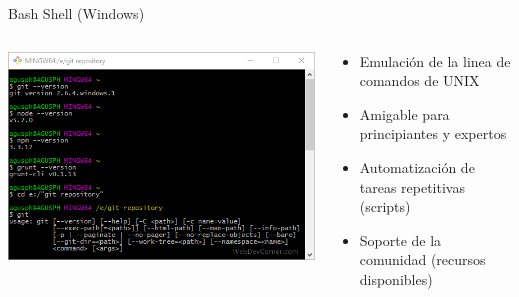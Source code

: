\documentclass{beamer}
\begin{document}
\begin{frame}{Bash Shell (Windows)}
	\begin{columns}
		\begin{column}{.5\textwidth}
			\includegraphics[scale=.3]{img/git_bash.png}
		\end{column}
		\begin{column}{.5\textwidth}
			
			\begin{itemize}
				\item Emulación de la linea de comandos de UNIX
				\item Amigable para principiantes y expertos
				\item Automatización de tareas repetitivas (scripts)
				\item Soporte de la comunidad (recursos disponibles)
			\end{itemize}
		\end{column}
	\end{columns}
	
\end{frame}
\end{document}
